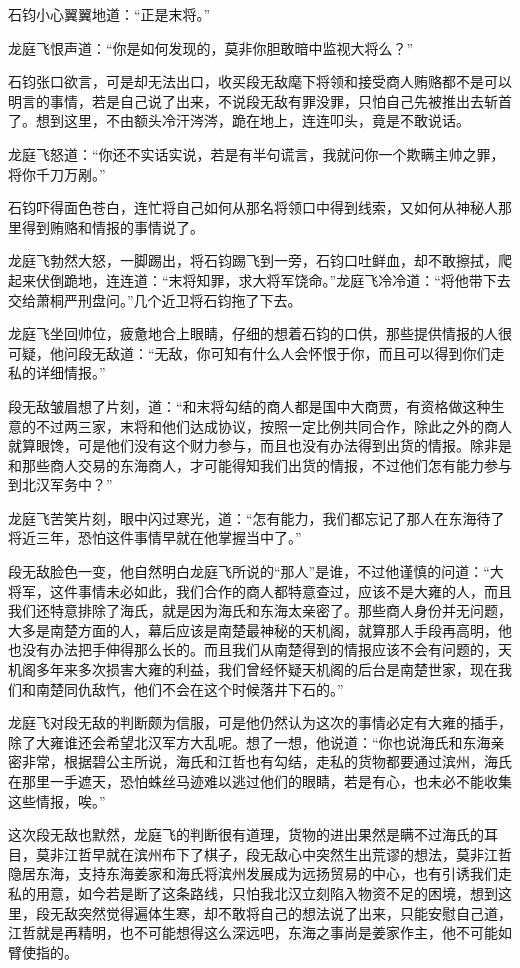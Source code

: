 石钧小心翼翼地道：“正是末将。”

龙庭飞恨声道：“你是如何发现的，莫非你胆敢暗中监视大将么？”

石钧张口欲言，可是却无法出口，收买段无敌麾下将领和接受商人贿赂都不是可以明言的事情，若是自己说了出来，不说段无敌有罪没罪，只怕自己先被推出去斩首了。想到这里，不由额头冷汗涔涔，跪在地上，连连叩头，竟是不敢说话。

龙庭飞怒道：“你还不实话实说，若是有半句谎言，我就问你一个欺瞒主帅之罪，将你千刀万剐。”

石钧吓得面色苍白，连忙将自己如何从那名将领口中得到线索，又如何从神秘人那里得到贿赂和情报的事情说了。

龙庭飞勃然大怒，一脚踢出，将石钧踢飞到一旁，石钧口吐鲜血，却不敢擦拭，爬起来伏倒跪地，连连道：“末将知罪，求大将军饶命。”龙庭飞冷冷道：“将他带下去交给萧桐严刑盘问。”几个近卫将石钧拖了下去。

龙庭飞坐回帅位，疲惫地合上眼睛，仔细的想着石钧的口供，那些提供情报的人很可疑，他问段无敌道：“无敌，你可知有什么人会怀恨于你，而且可以得到你们走私的详细情报。”

段无敌皱眉想了片刻，道：“和末将勾结的商人都是国中大商贾，有资格做这种生意的不过两三家，末将和他们达成协议，按照一定比例共同合作，除此之外的商人就算眼馋，可是他们没有这个财力参与，而且也没有办法得到出货的情报。除非是和那些商人交易的东海商人，才可能得知我们出货的情报，不过他们怎有能力参与到北汉军务中？”

龙庭飞苦笑片刻，眼中闪过寒光，道：“怎有能力，我们都忘记了那人在东海待了将近三年，恐怕这件事情早就在他掌握当中了。”

段无敌脸色一变，他自然明白龙庭飞所说的“那人”是谁，不过他谨慎的问道：“大将军，这件事情未必如此，我们合作的商人都特意查过，应该不是大雍的人，而且我们还特意排除了海氏，就是因为海氏和东海太亲密了。那些商人身份并无问题，大多是南楚方面的人，幕后应该是南楚最神秘的天机阁，就算那人手段再高明，他也没有办法把手伸得那么长的。而且我们从南楚得到的情报应该不会有问题的，天机阁多年来多次损害大雍的利益，我们曾经怀疑天机阁的后台是南楚世家，现在我们和南楚同仇敌忾，他们不会在这个时候落井下石的。”

龙庭飞对段无敌的判断颇为信服，可是他仍然认为这次的事情必定有大雍的插手，除了大雍谁还会希望北汉军方大乱呢。想了一想，他说道：“你也说海氏和东海亲密非常，根据碧公主所说，海氏和江哲也有勾结，走私的货物都要通过滨州，海氏在那里一手遮天，恐怕蛛丝马迹难以逃过他们的眼睛，若是有心，也未必不能收集这些情报，唉。”

这次段无敌也默然，龙庭飞的判断很有道理，货物的进出果然是瞒不过海氏的耳目，莫非江哲早就在滨州布下了棋子，段无敌心中突然生出荒谬的想法，莫非江哲隐居东海，支持东海姜家和海氏将滨州发展成为远扬贸易的中心，也有引诱我们走私的用意，如今若是断了这条路线，只怕我北汉立刻陷入物资不足的困境，想到这里，段无敌突然觉得遍体生寒，却不敢将自己的想法说了出来，只能安慰自己道，江哲就是再精明，也不可能想得这么深远吧，东海之事尚是姜家作主，他不可能如臂使指的。

